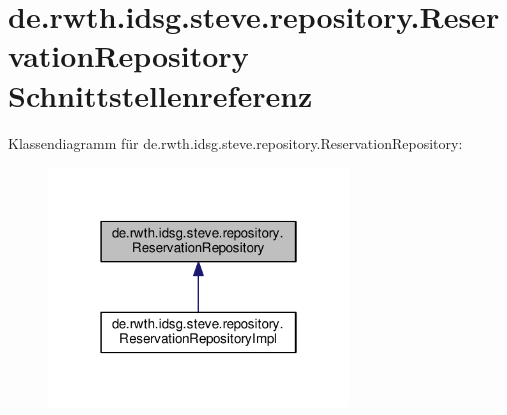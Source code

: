 \hypertarget{interfacede_1_1rwth_1_1idsg_1_1steve_1_1repository_1_1_reservation_repository}{\section{de.\-rwth.\-idsg.\-steve.\-repository.\-Reservation\-Repository Schnittstellenreferenz}
\label{interfacede_1_1rwth_1_1idsg_1_1steve_1_1repository_1_1_reservation_repository}
}


Klassendiagramm für de.\-rwth.\-idsg.\-steve.\-repository.\-Reservation\-Repository\-:
\nopagebreak
\begin{figure}[H]
\begin{center}
\leavevmode
\includegraphics[width=226pt]{interfacede_1_1rwth_1_1idsg_1_1steve_1_1repository_1_1_reservation_repository__inherit__graph}
\end{center}
\end{figure}
